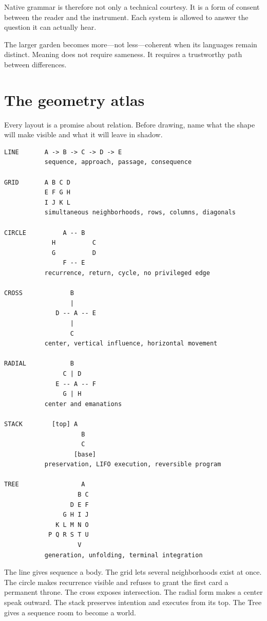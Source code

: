 Native grammar is therefore not only a technical courtesy. It is a form of
consent between the reader and the instrument. Each system is allowed to answer
the question it can actually hear.

The larger garden becomes more—not less—coherent when its languages remain
distinct. Meaning does not require sameness. It requires a trustworthy path
between differences.

\section{The geometry atlas}

Every layout is a promise about relation. Before drawing, name what the shape
will make visible and what it will leave in shadow.

\begin{verbatim}
LINE       A -> B -> C -> D -> E
           sequence, approach, passage, consequence

GRID       A B C D
           E F G H
           I J K L
           simultaneous neighborhoods, rows, columns, diagonals

CIRCLE          A -- B
             H          C
             G          D
                F -- E
           recurrence, return, cycle, no privileged edge

CROSS             B
                  |
              D -- A -- E
                  |
                  C
           center, vertical influence, horizontal movement

RADIAL            B
                C | D
              E -- A -- F
                G | H
           center and emanations

STACK        [top] A
                     B
                     C
                   [base]
           preservation, LIFO execution, reversible program

TREE                 A
                    B C
                  D E F
                G H I J
              K L M N O
            P Q R S T U
                    V
           generation, unfolding, terminal integration
\end{verbatim}

The line gives sequence a body. The grid lets several neighborhoods exist at
once. The circle makes recurrence visible and refuses to grant the first card a
permanent throne. The cross exposes intersection. The radial form makes a
center speak outward. The stack preserves intention and executes from its top.
The Tree gives a sequence room to become a world.

